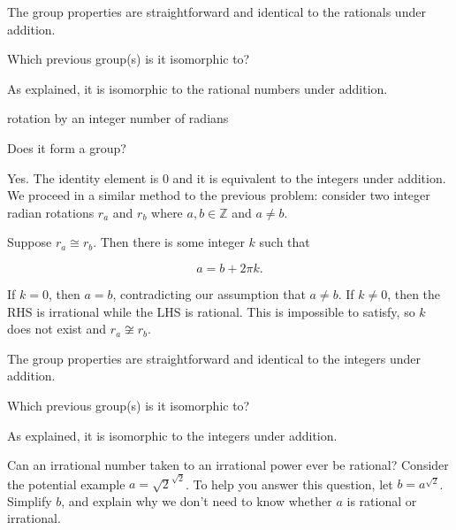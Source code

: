 \documentclass[../key.tex]{subfiles}
\begin{document}
The group properties are straightforward and identical to the rationals under addition.

\begin{iinner_problem}
\item Which previous group(s) is it isomorphic to?
\end{iinner_problem}

\noindent As explained, it is isomorphic to the rational numbers under addition.

\begin{inner_problem}
\item rotation by an integer number of radians
\end{inner_problem}

\begin{iinner_problem}[start=1]
\item Does it form a group?
\end{iinner_problem}

\noindent Yes. The identity element is $0$ and it is equivalent to the integers under addition. We proceed in a similar method to the previous problem: consider two integer radian rotations $r_a$ and $r_b$ where $a,b\in \mathbb{Z}$ and $a\neq b$.

Suppose $r_a\cong r_b$. Then there is some integer $k$ such that

$$a=b+2\pi k.$$

\noindent If $k=0$, then $a=b$, contradicting our assumption that $a\neq b$. If $k\neq 0$, then the RHS is irrational while the LHS is rational. This is impossible to satisfy, so $k$ does not exist and $r_a\not\cong r_b$.

The group properties are straightforward and identical to the integers under addition.

\begin{iinner_problem}
\item Which previous group(s) is it isomorphic to?
\end{iinner_problem}

\noindent As explained, it is isomorphic to the integers under addition.

\begin{outer_problem}
\item Can an irrational number taken to an irrational power ever be rational? Consider the potential example $a = \sqrt{2}^{\sqrt{2}}$. To help you answer this question, let $b = a^{\sqrt{2}}$. Simplify $b$, and explain why we don’t need to know whether $a$ is rational or irrational.
\end{outer_problem}
\end{document}
